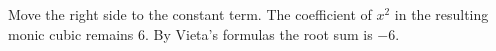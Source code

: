Move the right side to the constant term. The coefficient of $x^2$ in the resulting monic cubic remains 6. By Vieta's formulas the root sum is $\boxed{-6}$.
